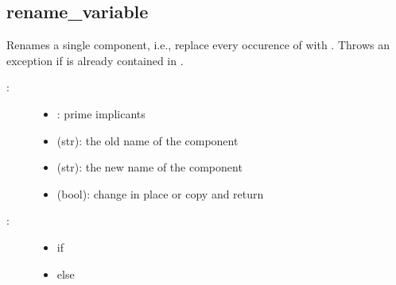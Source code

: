 \documentclass[letterpaper,10pt,english]{sphinxmanual}
\begin{document}
\begin{fulllineitems}
\end{fulllineitems}



\subsection{rename\_variable}
\label{\detokenize{PrimeImplicants:rename-variable}}\label{\detokenize{PrimeImplicants:id15}}

\begin{fulllineitems}
\label{\detokenize{PrimeImplicants:PyBoolNet.PrimeImplicants.rename_variable}}
Renames a single component, i.e., replace every occurence of  with .
Throws an exception if  is already contained in .
\begin{description}
\item[{:}] \leavevmode\begin{itemize}
\item {} 
: prime implicants

\item {} 
 (str): the old name of the component

\item {} 
 (str): the new name of the component

\item {} 
 (bool): change  in place or copy and return

\end{itemize}

\item[{:}] \leavevmode\begin{itemize}
\item {} 
 if 

\item {} 
 else

\end{itemize}

\end{description}


\end{fulllineitems}
\end{document}
